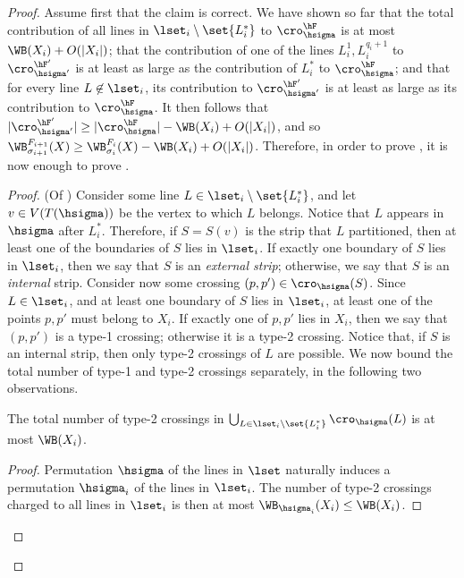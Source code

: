 \begin{proof}
	Assume first that the claim is correct. We have shown so far that the total contribution of all lines in $\lset_i\setminus\set{L_i^*}$ to $\cro^{\hF}_{\hsigma}$ is at most $\WB(X_i)+O(|X_i|)$; that the contribution of one of the lines $L_i^1,L_i^{q_i+1}$ to $\cro^{\hF'}_{\hsigma'}$ is at least as large as the contribution of $L_i^*$ to $\cro^{\hF}_{\hsigma}$; and that for every line $L\not\in \lset_i$, its contribution to $\cro^{\hF'}_{\hsigma'}$ is at least as large as its contribution to $\cro^{\hF}_{\hsigma}$. It then follows that $|\cro^{\hF'}_{\hsigma'}|\geq |\cro^{\hF}_{\hsigma}|-\WB(X_i)+O(|X_i|)$, and so
	$\WB^{F_{i+1}}_{\sigma_{i+1}}(X)\geq \WB^{F_i}_{\sigma_i}(X)-\WB(X_i)+O(|X_i|)$. Therefore, in order to prove , it is now enough to prove .
	
	\begin{proof} (Of )
		Consider some line $L\in \lset_i\setminus\set{L_i^*}$, and let $v\in V(T({\hsigma}))$ be the vertex to which $L$ belongs. Notice that $L$ appears in $\hsigma$ after $L_i^*$. Therefore, if $S=S(v)$ is the strip that $L$ partitioned, then at least one of the boundaries of $S$ lies in $\lset_i$. If exactly one boundary of $S$ lies in $\lset_i$, then we say that $S$ is an \emph{external strip}; otherwise, we say that $S$ is an \emph{internal} strip. Consider now some crossing $(p,p')\in \cro_{\hsigma}(S)$. Since $L\in \lset_i$, and at least one boundary of $S$ lies in $\lset_i$, at least one of the points $p,p'$ must belong to $X_i$. If exactly one of $p,p'$ lies in $X_i$, then we say that $(p,p')$ is a type-1 crossing; otherwise it is a type-2 crossing. Notice that, if $S$ is an internal strip, then only type-2 crossings of $L$ are possible. We now bound the total number of type-1 and type-2 crossings separately, in the following two observations.
		
		
		\begin{myobs}\label{obs: type 2 crossings}
			The total number of type-2 crossings in $\bigcup_{L\in \lset_i\setminus\set{L_i^*}}\cro_{\hsigma}(L)$ is at most $\WB(X_i)$.
		\end{myobs}
		
		\begin{proof}
			Permutation $\hsigma$ of the lines in $\lset$ naturally induces a permutation $\hsigma_i$ of the lines in $\lset_i$. The number of type-2 crossings charged to all lines in $\lset_i$ is then at most $\WB_{\hsigma_i}(X_i)\leq \WB(X_i)$.%
		\end{proof}
		

\end{proof}
\end{proof}
